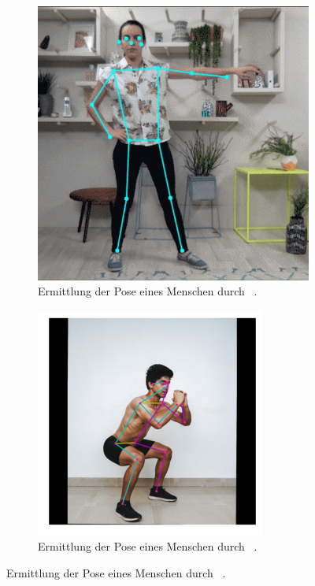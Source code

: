 \begin{figure}
    \centering
    \begin{subfigure}[t]{0.3\textwidth}
        \includegraphics[width=\textwidth]{gfx/posenet.png}
        \caption{Ermittlung der Pose eines Menschen durch ~\cite{Google2021}.}\label{fig:posenet}
    \end{subfigure}
    \begin{subfigure}[t]{0.3\textwidth}
        \includegraphics[width=\textwidth]{gfx/movenet.png}
        \caption{Ermittlung der Pose eines Menschen durch ~\cite{Google2021a}.}\label{fig:movenet}
    \end{subfigure}
    \label{fig:pose_estimation}
\end{figure}

